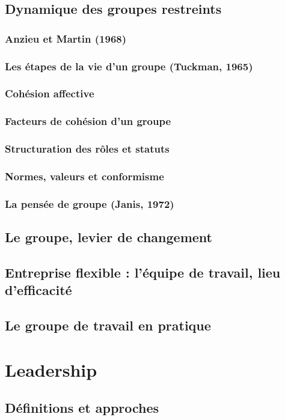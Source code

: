 \documentclass[12pt]{article}
\begin{document}
	\subsection{Dynamique des groupes restreints}
		\subsubsection{Anzieu et Martin (1968)}
		\subsubsection{Les étapes de la vie d’un groupe (Tuckman, 1965)}
		\subsubsection{Cohésion affective}
		\subsubsection{Facteurs de cohésion d’un groupe}
		\subsubsection{Structuration des rôles et statuts}
		\subsubsection{Normes, valeurs et conformisme}
		\subsubsection{La pensée de groupe (Janis, 1972)}
	\subsection{Le groupe, levier de changement}
	\subsection{Entreprise flexible : l’équipe de travail, lieu d’efficacité}
	\subsection{Le groupe de travail en pratique}
		
\section{Leadership}
	\subsection{Définitions et approches}
\end{document}
